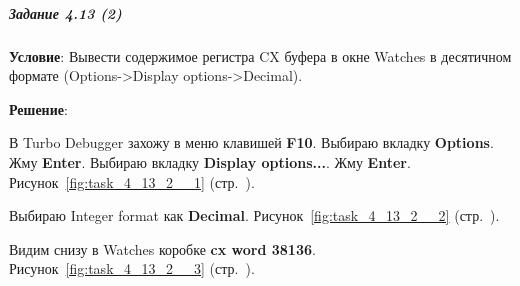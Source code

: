 \subparagraph{Задание 4.13 (2)}

\textbf{Условие}:
Вывести содержимое регистра CX буфера в окне Watches в десятичном формате (Options->Display options->Decimal).

\textbf{Решение}:

В Turbo Debugger захожу в меню клавишей \textbf{F10}. Выбираю вкладку \textbf{Options}. Жму \textbf{Enter}. Выбираю вкладку \textbf{Display options...}. Жму \textbf{Enter}.
Рисунок~\ref{fig:task_4_13_2__1} (стр.~\pageref{fig:task_4_13_2__1}).

Выбираю Integer format как \textbf{Decimal}.
Рисунок~\ref{fig:task_4_13_2__2} (стр.~\pageref{fig:task_4_13_2__2}).

Видим снизу в Watches коробке \textbf{cx word 38136}.
Рисунок~\ref{fig:task_4_13_2__3} (стр.~\pageref{fig:task_4_13_2__3}).


